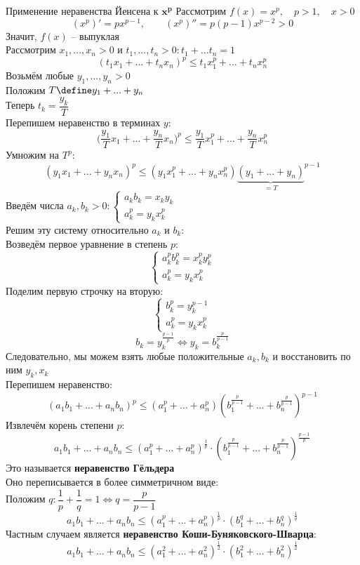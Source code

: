 \begin{undefthm}{Применение неравенства Йенсена к $\bm{x^p}$}
    Рассмотрим $f(x) = x^p, \quad p > 1, \quad x > 0 $
    $$ (x^p)' = px^{p - 1}, \qquad (x^p)'' = p(p - 1)x^{p - 2} > 0 $$
    Значит, $f(x)$ -- выпуклая \\
    Рассмотрим $x_1, ..., x_n > 0$ и $t_1, ..., t_n > 0 : t_1 + ... t_n = 1 $
    $$ (t_1x_1 + ... + t_nx_n)^p \le t_1x_1^p + ... + t_nx_n^p $$
    Возьмём любые $y_1, ..., y_n > 0 $ \\
    Положим $ T \define y_1 + ... + y_n $ \\
    Теперь $t_k = \dfrac{y_k}T $ \\
    Перепишем неравенство в терминах $y$:
    $$ \bigg( \frac{y_1}Tx_1 + ... + \frac{y_n}Tx_n \bigg)^p \le \frac{y_1}Tx_1^p + ... + \frac{y_n}Tx_n^p $$
    Умножим на $T^p$:
    $$ (y_1x_1 + ... + y_nx_n)^p \le (y_1x_1^p + ... + y_nx_n^p){\underbrace{(y_1 + ... + y_n)}_{= T}}^{p - 1} $$
    Введём числа $ a_k, b_k > 0 :
    \begin{cases}
    	a_kb_k = x_ky_k \\
        a_k^p = y_kx_k^p
    \end{cases} $ \\
    Решим эту систему относительно $a_k$ и $b_k$: \\
    Возведём первое уравнение в степень $p$:
    $$
    \begin{cases}
       	a_k^pb_k^p = x_k^py_k^p \\
        a_k^p = y_kx_k^p
    \end{cases} $$
    Поделим первую строчку на вторую:
    $$
    \begin{cases}
        b_k^p = y_k^{p - 1} \\
        a_k^p = y_kx_k^p
    \end{cases} $$
    $$ b_k = y_k^{\frac{p - 1}p} \iff y_k = b_k^{\frac{p}{p - 1}} $$
    Следовательно, мы можем взять любые положительные $a_k, b_k$ и восстановить по ним $y_k, x_k$ \\
    Перепишем неравенство:
    $$ (a_1b_1 + ... + a_nb_n)^p \le (a_1^p + ... + a_n^p)(b_1^{\frac{p}{p - 1}} + ... + b_n^{\frac{p}{p - 1}})^{p - 1} $$
    Извлечём корень степени $p$:
    $$ a_1b_1 + ... + a_nb_n \le (a_1^p + ... + a_n^p)^{\frac1p} \cdot (b_1^{\frac{p}{p - 1}} + ... + b_n^{\frac{p}{p - 1}})^{\frac{p - 1}p} $$
    Это называется \textbf{неравенство Гёльдера} \\
    Оно переписывается в более симметричном виде: \\
    Положим $ q : \dfrac1p + \dfrac1q = 1 \iff q = \dfrac{p}{p - 1} $
    $$ a_1b_1 + ... + a_nb_n \le (a_1^p + ... + a_n^p)^{\frac1p} \cdot (b_1^q + ... + b_n^q)^{\frac1q} $$
    Частным случаем является \textbf{неравенство Коши-Буняковского-Шварца}:
    $$ a_1b_1 + ... + a_nb_n \le (a_1^2 + ... + a_n^2)^{\frac12} \cdot (b_1^2 + ... + b_n^2)^{\frac12} $$
\end{undefthm}


